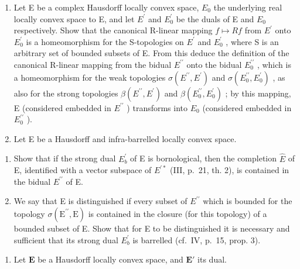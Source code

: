 \begin{enumerate}
\def\labelenumi{\arabic{enumi})}
\setcounter{enumi}{2}
\item
  Let E be a complex Hausdorff locally convex space, \(E_{0}\) the underlying real locally convex space to E, and let \(E^{\prime}\) and \(E_{0}^{\prime}\) be the duals of E and \(E_{0}\) respectively. Show that the canonical R-linear mapping \(f \mapsto Rf\) from \(E^{\prime}\) onto \(E_{0}^{\prime}\) is a homeomorphism for the S-topologies on \(E^{\prime}\) and \(E_{0}^{\prime}\) , where S is an arbitrary set of bounded subsets of E. From this deduce the definition of the canonical R-linear mapping from the bidual \(E^{\prime\prime}\) onto the bidual \(E_{0}^{\prime\prime}\) , which is a homeomorphism for the weak topologies \(\sigma(E^{\prime\prime}, E^{\prime})\) and \(\sigma(E_{0}^{\prime\prime}, E_{0}^{\prime})\) , as also for the strong topologies \(\beta(E^{\prime\prime}, E^{\prime})\) and \(\beta(E_{0}^{\prime\prime}, E_{0}^{\prime})\) ; by this mapping, E (considered embedded in \(E^{\prime\prime}\) ) transforms into \(E_{0}\) (considered embedded in \(E_{0}^{\prime\prime}\) ).
\item
  Let E be a Hausdorff and infra-barrelled locally convex space.
\end{enumerate}

\begin{enumerate}
\def\labelenumi{\alph{enumi})}
\tightlist
\item
  Show that if the strong dual \(E_{b}^{\prime}\) of E is bornological, then the completion \(\hat{E}\) of E, identified with a vector subspace of \(E^{\prime*}\) (III, p.~21, th. 2), is contained in the bidual \(E^{\prime\prime}\) of E.
\item
  We say that E is distinguished if every subset of \(E^{\prime\prime}\) which is bounded for the topology \(\sigma(\mathrm{E}^{\prime\prime}, \mathrm{E})\) is contained in the closure (for this topology) of a bounded subset of E. Show that for E to be distinguished it is necessary and sufficient that its strong dual \(E_{b}^{\prime}\) is barrelled (cf.~IV, p.~15, prop. 3).
\end{enumerate}

\begin{enumerate}
\def\labelenumi{\arabic{enumi})}
\setcounter{enumi}{4}
\tightlist
\item
  Let \(\mathbf{E}\) be a Hausdorff locally convex space, and \(\mathbf{E}'\) its dual.
\end{enumerate}

